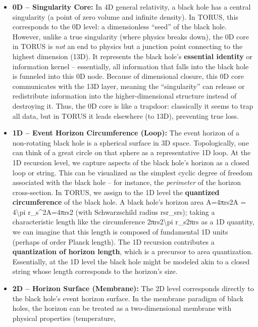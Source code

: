 \documentclass[]{article}
\begin{document}
\begin{itemize}
\item
  \textbf{0D -- Singularity Core:} In 4D general relativity, a black
  hole has a central singularity (a point of zero volume and infinite
  density). In TORUS, this corresponds to the 0D level: a dimensionless
  ``seed'' of the black hole. However, unlike a true singularity (where
  physics breaks down), the 0D core in TORUS is \emph{not} an end to
  physics but a junction point connecting to the highest dimension
  (13D). It represents the black hole's \textbf{essential identity} or
  information kernel -- essentially, all information that falls into the
  black hole is funneled into this 0D node. Because of dimensional
  closure, this 0D core communicates with the 13D layer, meaning the
  ``singularity'' can release or redistribute information into the
  higher-dimensional structure instead of destroying it. Thus, the 0D
  core is like a trapdoor: classically it seems to trap all data, but in
  TORUS it leads elsewhere (to 13D), preventing true loss.
\item
  \textbf{1D -- Event Horizon Circumference (Loop):} The event horizon
  of a non-rotating black hole is a spherical surface in 3D space.
  Topologically, one can think of a great circle on that sphere as a
  representative 1D loop. At the 1D recursion level, we capture aspects
  of the black hole's horizon as a closed loop or string. This can be
  visualized as the simplest cyclic degree of freedom associated with
  the black hole -- for instance, the \emph{perimeter} of the horizon
  cross-section. In TORUS, we assign to the 1D level the
  \textbf{quantized circumference} of the black hole. A black hole's
  horizon area A=4πrs2A = 4\textbackslash{}pi r\_s\^{}2A=4πrs2​ (with
  Schwarzschild radius rsr\_srs​); taking a characteristic length like
  the circumference 2πrs2\textbackslash{}pi r\_s2πrs​ as a 1D quantity,
  we can imagine that this length is composed of fundamental 1D units
  (perhaps of order Planck length). The 1D recursion contributes a
  \textbf{quantization of horizon length}, which is a precursor to area
  quantization. Essentially, at the 1D level the black hole might be
  modeled akin to a closed string whose length corresponds to the
  horizon's size.
\item
  \textbf{2D -- Horizon Surface (Membrane):} The 2D level corresponds
  directly to the black hole's event horizon surface. In the membrane
  paradigm of black holes, the horizon can be treated as a
  two-dimensional membrane with physical properties (temperature,

\end{itemize}
\end{document}

